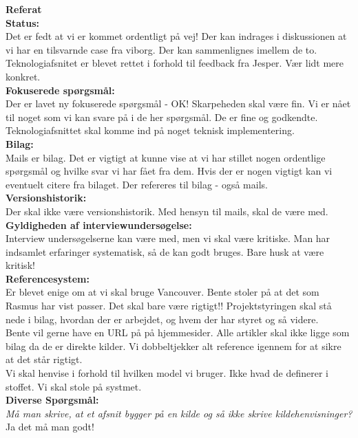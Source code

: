 \textbf{Referat} 
\\
\textbf{Status:}\\
Det er fedt at vi er kommet ordentligt på vej! Der kan indrages i diskussionen at vi har en tilsvarnde case fra viborg. Der kan sammenlignes imellem de to.\\ 
Teknologiafsnitet er blevet rettet i forhold til feedback fra Jesper. Vær lidt mere konkret.\\ 
\textbf{Fokuserede spørgsmål:}\\
Der er lavet ny fokuserede spørgsmål - OK! Skarpeheden skal være fin. Vi er nået til noget som vi kan svare på i de her spørgsmål. De er fine og godkendte. \\
Teknologiafsnittet skal komme ind på noget teknisk implementering.\\ 
\textbf{Bilag:}\\
Mails er bilag. Det er vigtigt at kunne vise at vi har stillet nogen ordentlige spørgsmål og hvilke svar vi har fået fra dem. Hvis der er nogen vigtigt kan vi eventuelt citere fra bilaget. Der refereres til bilag - også mails.\\ 
\textbf{Versionshistorik:}\\
Der skal ikke være versionshistorik. Med hensyn til mails, skal de være med. \\
\textbf{Gyldigheden af interviewundersøgelse:}\\
Interview undersøgelserne kan være med, men vi skal være kritiske. Man har indsamlet erfaringer systematisk, så de kan godt bruges. Bare husk at være kritisk!\\ 
\textbf{Referencesystem:}\\
Er blevet enige om at vi skal bruge Vancouver. Bente stoler på at det som Rasmus har vist passer. Det skal bare være rigtigt!! Projektstyringen skal stå nede i bilag, hvordan der er arbejdet, og hvem der har styret og så videre. \\
Bente vil gerne have en URL på på hjemmesider. Alle artikler skal ikke ligge som bilag da de er direkte kilder. Vi dobbeltjekker alt reference igennem for at sikre at det står rigtigt. \\
Vi skal henvise i forhold til hvilken model vi bruger. Ikke hvad de definerer i stoffet. Vi skal stole på systmet.\\

\textbf{Diverse Spørgsmål:}\\
\textit{Må man skrive, at et afsnit bygger på en kilde og så ikke skrive kildehenvisninger?}\\
Ja det må man godt!\\


